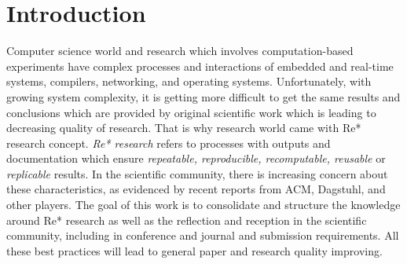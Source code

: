 \chapter{Introduction}
Computer science world and research which involves computation-based experiments have complex processes and interactions of embedded and real-time systems, compilers, networking, and operating systems. Unfortunately, with growing system complexity, it is getting more difficult to get the same results and conclusions which are provided by original scientific work which is leading to decreasing quality of research. That is why research world came with Re* research concept. \emph{Re* research} refers to processes with outputs and documentation which ensure \emph{repeatable, reproducible, recomputable, reusable} or \emph{replicable} results. In the scientific community, there is increasing concern about these characteristics, as evidenced by recent reports from ACM, Dagstuhl, and other players. The goal of this work is to consolidate and structure the knowledge around Re* research as well as the reflection and reception in the scientific community, including in conference and journal and submission requirements. All these best practices will lead to general paper and research quality improving.

